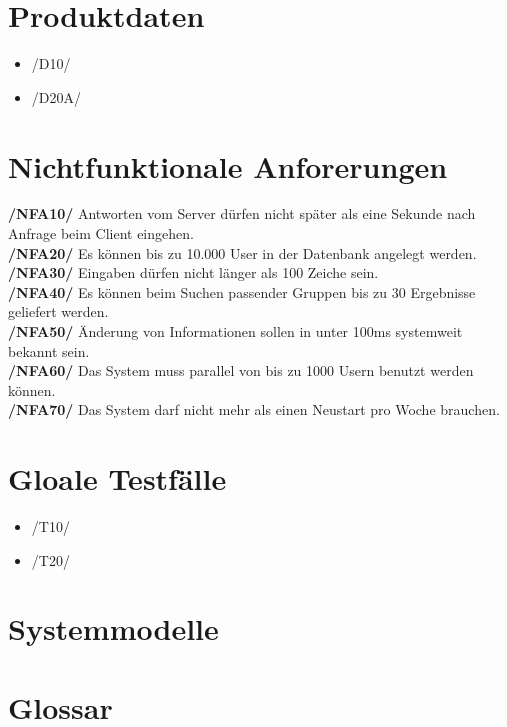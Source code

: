 \documentclass[a4paper]{scrreprt}
\begin{document}
\chapter{Produktdaten}
\begin{itemize}
\item /D10/ 
\item /D20A/
\end{itemize}

\chapter{Nichtfunktionale Anforerungen}

\begin{addmargin}[25pt]{0pt} 
\textbf{/NFA10/} Antworten vom Server dürfen nicht später als eine Sekunde nach Anfrage beim Client eingehen.\\
\textbf{/NFA20/} Es können bis zu 10.000 User in der Datenbank angelegt werden.\\
\textbf{/NFA30/} Eingaben dürfen nicht länger als 100 Zeiche sein.\\
\textbf{/NFA40/} Es können beim Suchen passender Gruppen bis zu 30 Ergebnisse geliefert werden.\\
\textbf{/NFA50/} Änderung von Informationen sollen in unter 100ms systemweit bekannt sein.\\
\textbf{/NFA60/} Das System muss parallel von bis zu 1000 Usern benutzt werden können.\\
\textbf{/NFA70/} Das System darf nicht mehr als einen Neustart pro Woche brauchen.\\
\end{addmargin}


\chapter{Gloale Testfälle}
\begin{itemize}
\item /T10/ 
\item /T20/

\end{itemize}

\chapter{Systemmodelle}

\chapter{Glossar}
 

 
\end{document}
